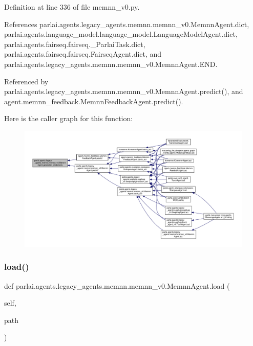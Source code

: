 Definition at line 336 of file memnn\+\_\+v0.\+py.



References parlai.\+agents.\+legacy\+\_\+agents.\+memnn.\+memnn\+\_\+v0.\+Memnn\+Agent.\+dict, parlai.\+agents.\+language\+\_\+model.\+language\+\_\+model.\+Language\+Model\+Agent.\+dict, parlai.\+agents.\+fairseq.\+fairseq.\+\_\+\+Parlai\+Task.\+dict, parlai.\+agents.\+fairseq.\+fairseq.\+Fairseq\+Agent.\+dict, and parlai.\+agents.\+legacy\+\_\+agents.\+memnn.\+memnn\+\_\+v0.\+Memnn\+Agent.\+E\+ND.



Referenced by parlai.\+agents.\+legacy\+\_\+agents.\+memnn.\+memnn\+\_\+v0.\+Memnn\+Agent.\+predict(), and agent.\+memnn\+\_\+feedback.\+Memnn\+Feedback\+Agent.\+predict().

Here is the caller graph for this function\+:
\nopagebreak
\begin{figure}[H]
\begin{center}
\leavevmode
\includegraphics[width=350pt]{classparlai_1_1agents_1_1legacy__agents_1_1memnn_1_1memnn__v0_1_1MemnnAgent_a15b8b76a2d2ae5e0a4de2978e5ac0ac5_icgraph}
\end{center}
\end{figure}
\mbox{\label{classparlai_1_1agents_1_1legacy__agents_1_1memnn_1_1memnn__v0_1_1MemnnAgent_a43e08459f9552c66ef389b8727b8eff3}} 
\subsubsection{\texorpdfstring{load()}{load()}}
{\footnotesize\ttfamily def parlai.\+agents.\+legacy\+\_\+agents.\+memnn.\+memnn\+\_\+v0.\+Memnn\+Agent.\+load (\begin{DoxyParamCaption}\item[{}]{self,  }\item[{}]{path }\end{DoxyParamCaption})}



